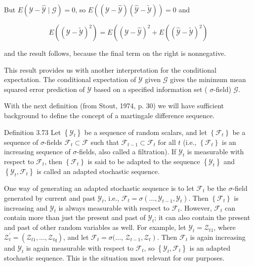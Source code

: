 \documentclass[10pt]{article}
\begin{document}
But $E(\mathcal{Y}-\hat{\mathcal{Y}} \mid \mathcal{G})=0$, so $E((\mathcal{Y}-\hat{\mathcal{Y}})(\hat{\mathcal{Y}}-\tilde{\mathcal{Y}}))=0$ and

$$
E\left((\mathcal{Y}-\tilde{\mathcal{Y}})^{2}\right)=E\left((\mathcal{Y}-\hat{\mathcal{Y}})^{2}+E\left((\hat{\mathcal{Y}}-\tilde{\mathcal{Y}})^{2}\right)\right.
$$

and the result follows, because the final term on the right is nonnegative.

This result provides us with another interpretation for the conditional expectation. The conditional expectation of $\mathcal{Y}$ given $\mathcal{G}$ gives the minimum mean squared error prediction of $\mathcal{Y}$ based on a specified information set ( $\sigma$-field) $\mathcal{G}$.

With the next definition (from Stout, 1974, p. 30) we will have sufficient background to define the concept of a martingale difference sequence.

Definition 3.73 Let $\left\{\mathcal{Y}_{t}\right\}$ be a sequence of random scalars, and let $\left\{\mathcal{F}_{t}\right\}$ be a sequence of $\sigma$-fields $\mathcal{F}_{t} \subset \mathcal{F}$ such that $\mathcal{F}_{t-1} \subset \mathcal{F}_{t}$ for all $t$ (i.e., $\left\{\mathcal{F}_{t}\right\}$ is an increasing sequence of $\sigma$-fields, also called a filtration). If $\mathcal{Y}_{t}$ is measurable with respect to $\mathcal{F}_{t}$, then $\left\{\mathcal{F}_{t}\right\}$ is said to be adapted to the sequence $\left\{\mathcal{Y}_{t}\right\}$ and $\left\{\mathcal{Y}_{t}, \mathcal{F}_{t}\right\}$ is called an adapted stochastic sequence.

One way of generating an adapted stochastic sequence is to let $\mathcal{F}_{t}$ be the $\sigma$-field generated by current and past $\mathcal{Y}_{t}$, i.e., $\mathcal{F}_{t}=\sigma\left(\ldots, \mathcal{Y}_{t-1}, \mathcal{Y}_{t}\right)$. Then $\left\{\mathcal{F}_{t}\right\}$ is increasing and $\mathcal{Y}_{t}$ is always measurable with respect to $\mathcal{F}_{t}$. However, $\mathcal{F}_{t}$ can contain more than just the present and past of $\mathcal{Y}_{t}$; it can also contain the present and past of other random variables as well. For example, let $\mathcal{Y}_{t}=\mathcal{Z}_{t 1}$, where $\mathcal{Z}_{t}^{\prime}=\left(\mathcal{Z}_{t 1}, \ldots, \mathcal{Z}_{t q}\right)$, and let $\mathcal{F}_{t}=\sigma(\ldots$, $\left.\mathcal{Z}_{t-1}, \mathcal{Z}_{t}\right)$. Then $\mathcal{F}_{t}$ is again increasing and $\mathcal{Y}_{t}$ is again measurable with respect to $\mathcal{F}_{t}$, so $\left\{\mathcal{Y}_{t}, \mathcal{F}_{t}\right\}$ is an adapted stochastic sequence. This is the situation most relevant for our purposes.
\end{document}
